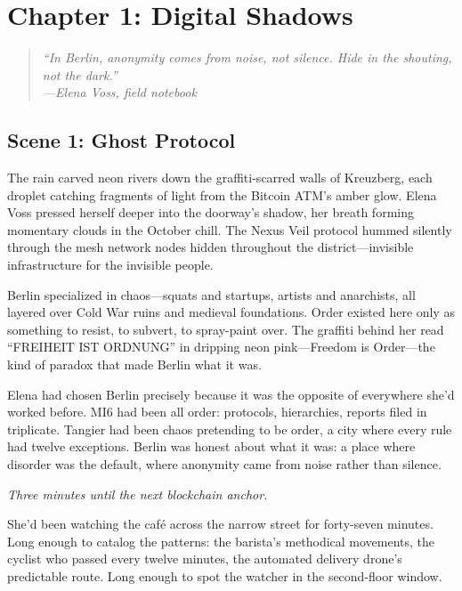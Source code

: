 \hypertarget{chapter-1-digital-shadows}{%
\section{Chapter 1: Digital Shadows}\label{chapter-1-digital-shadows}}

\begin{quote}
\itshape ``In Berlin, anonymity comes from noise, not silence. Hide in the
shouting, not the dark.''\\
\normalfont\hfill---Elena Voss, field notebook
\end{quote}

\hypertarget{scene-1-ghost-protocol}{%
\subsection{Scene 1: Ghost Protocol}\label{scene-1-ghost-protocol}}

The rain carved neon rivers down the graffiti-scarred walls of Kreuzberg, each droplet catching fragments of light from the Bitcoin ATM's amber glow. Elena Voss pressed herself deeper into the doorway's shadow, her breath forming momentary clouds in the October chill. The Nexus Veil protocol hummed silently through the mesh network nodes hidden throughout the district---invisible infrastructure for the invisible people.

Berlin specialized in chaos---squats and startups, artists and anarchists, all layered over Cold War ruins and medieval foundations. Order existed here only as something to resist, to subvert, to spray-paint over. The graffiti behind her read ``FREIHEIT IST ORDNUNG'' in dripping neon pink---Freedom is Order---the kind of paradox that made Berlin what it was.

Elena had chosen Berlin precisely because it was the opposite of everywhere she'd worked before. MI6 had been all order: protocols, hierarchies, reports filed in triplicate. Tangier had been chaos pretending to be order, a city where every rule had twelve exceptions. Berlin was honest about what it was: a place where disorder was the default, where anonymity came from noise rather than silence.

\emph{Three minutes until the next blockchain anchor.}

She'd been watching the café across the narrow street for forty-seven minutes. Long enough to catalog the patterns: the barista's methodical movements, the cyclist who passed every twelve minutes, the automated delivery drone's predictable route. Long enough to spot the watcher in the second-floor window.

